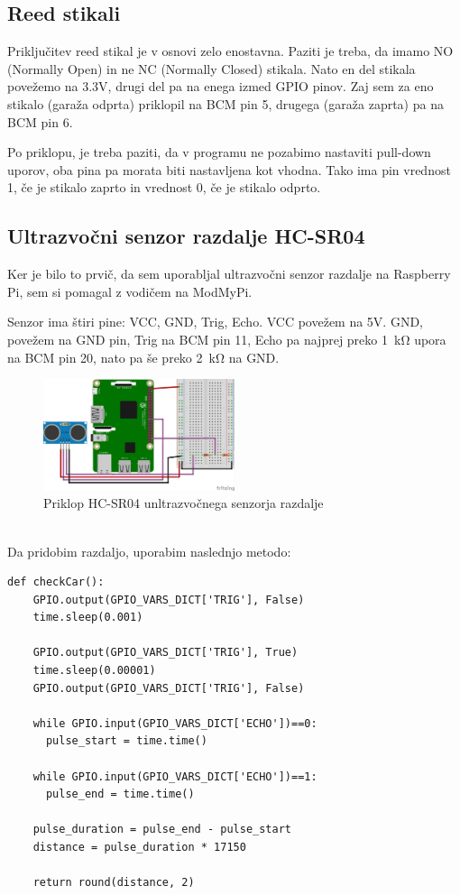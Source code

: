 \documentclass[11pt]{article}
\begin{document}
\subsection{Reed stikali}
Priključitev reed stikal je v osnovi zelo enostavna. Paziti je treba, da imamo NO (Normally Open) in ne NC (Normally Closed) stikala. Nato en del stikala povežemo na 3.3V, drugi del pa na enega izmed GPIO pinov. Zaj sem za eno stikalo (garaža odprta) priklopil na BCM pin 5, drugega (garaža zaprta) pa na BCM pin 6.

Po priklopu, je treba paziti, da v programu ne pozabimo nastaviti pull-down uporov, oba pina pa morata biti nastavljena kot vhodna. Tako ima pin vrednost 1, če je stikalo zaprto in vrednost 0, če je stikalo odprto.

\subsection{Ultrazvočni senzor razdalje HC-SR04}
Ker je bilo to prvič, da sem uporabljal ultrazvočni senzor razdalje na Raspberry Pi, sem si pomagal z vodičem na ModMyPi\cite{ModMyPi_us}.

Senzor ima štiri pine: VCC, GND, Trig, Echo. VCC povežem na 5V. GND, povežem na GND pin, Trig na BCM pin 11, Echo pa najprej preko \SI{1}{\kohm} upora na BCM pin 20, nato pa še preko \SI{2}{\kohm} na GND.
\begin{figure}[h]
\centering
\includegraphics[width=0.5\textwidth]{images/smartGarage_Distance_bb.png}
\caption{Priklop HC-SR04 unltrazvočnega senzorja razdalje}
\end{figure}\\
Da pridobim razdaljo, uporabim naslednjo metodo:
\begin{verbatim}
def checkCar():
    GPIO.output(GPIO_VARS_DICT['TRIG'], False)
    time.sleep(0.001)

    GPIO.output(GPIO_VARS_DICT['TRIG'], True)
    time.sleep(0.00001)
    GPIO.output(GPIO_VARS_DICT['TRIG'], False)

    while GPIO.input(GPIO_VARS_DICT['ECHO'])==0:
      pulse_start = time.time()

    while GPIO.input(GPIO_VARS_DICT['ECHO'])==1:
      pulse_end = time.time()

    pulse_duration = pulse_end - pulse_start
    distance = pulse_duration * 17150

    return round(distance, 2)
\end{verbatim}
\newpage
\end{document}
